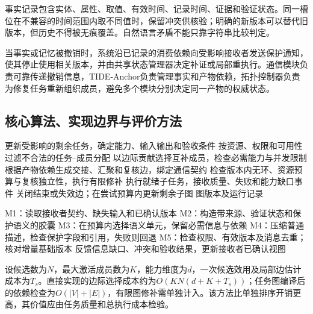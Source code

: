 事实记录包含实体、属性、取值、有效时间、记录时间、证据和验证状态。同一槽位在不兼容的时间范围内取不同值时，保留冲突供核验；明确的新版本可以替代旧版本，但历史不得被无痕覆盖。自然语言矛盾不能只靠字符串比较判定。

当事实或记忆被撤销时，系统沿已记录的消费依赖向受影响接收者发送保护通知，使其停止使用相关版本，并由共享状态管理器决定补证或局部重执行。通信模块负责可靠传递撤销信息，TIDE-Anchor负责管理事实和产物依赖，拓扑控制器负责为修复任务重新组织成员，避免多个模块分别决定同一产物的权威状态。

\subsection{核心算法、实现边界与评价方法}

\begin{algorithm}[htbp]
\caption{任务契约驱动的活跃协作图编译}
\label{alg:mesh_collaboration}
更新受影响的剩余任务，确定能力、输入输出和验收条件\;
按资源、权限和可用性过滤不合法的任务--成员分配\;
以边际贡献选择互补成员，检查必需能力与并发限制\;
根据产物依赖生成交接、汇聚和复核边，绑定通信契约\;
检查版本内无环、资源预算与复核独立性，执行有限修补\;
执行就绪子任务，接收质量、失败和能力缺口事件\;
关闭结束或失效边；在尝试预算内更新剩余子图\;
\Return 图版本及运行记录\;
\end{algorithm}

\begin{algorithm}[htbp]
\caption{协作边上的接收者条件化语义通信}
\label{alg:mesh_transport}
M1：读取接收者契约、缺失输入和已确认版本\;
M2：构造带来源、验证状态和保护语义的胶囊\;
M3：在预算内选择语义单元，保留必需信息与依赖\;
M4：压缩普通描述，检查保护字段和引用，失败则回退\;
M5：检查权限、有效版本及消息去重；核对增量基础版本\;
反馈信息缺口、冲突和验收结果，更新接收者已确认视图\;
\end{algorithm}

设候选数为$N$，最大激活成员数为$K$，能力维度为$d$，一次候选效用及局部边估计成本为$T_s$。直接实现的边际选择成本约为$O(KN(d+K+T_s))$；任务图编译后的依赖检查为$O(|V|+|E|)$，有限图修补需单独计入。该方法比单独排序开销更高，其价值应由任务质量和总执行成本检验。

